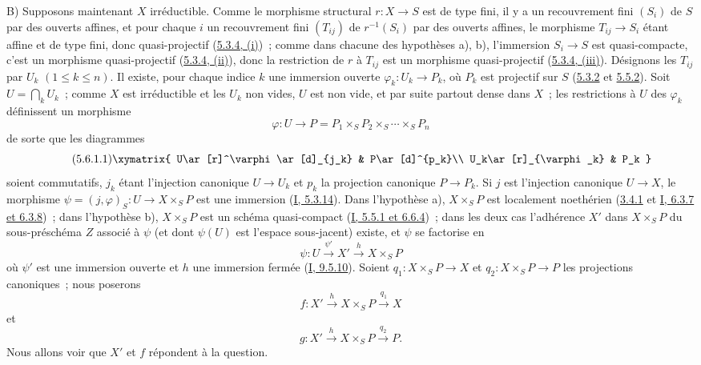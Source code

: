 B) Supposons maintenant $X$ irréductible. Comme le morphisme structural
$r:X\to S$ est de type fini, il y a un recouvrement fini $(S_i)$ de $S$ par
des ouverts affines, et pour chaque $i$ un recouvrement fini $(T_{ij})$ de
$r^{-1}(S_i)$ par des ouverts affines, le morphisme $T_{ij}\to S_i$ étant
affine et de type fini, donc quasi-projectif
(\hyperref[II.5.3.4-fr]{5.3.4, (i)})~; comme dans chacune des hypothèses a),
b), l'immersion $S_i\to S$ est quasi-compacte, c'est un morphisme
quasi-projectif (\hyperref[II.5.3.4-fr]{5.3.4, (ii)}), donc la restriction de
$r$ à $T_{ij}$ est un morphisme quasi-projectif
(\hyperref[II.5.3.4-fr]{5.3.4, (iii)}). Désignons les $T_{ij}$ par $U_k$
$(1\leq k\leq n)$. Il existe, pour chaque indice $k$ une immersion ouverte
$\varphi_k:U_k\to P_k$, où $P_k$ est projectif sur $S$
(\hyperref[II.5.3.2-fr]{5.3.2} et \hyperref[II.5.5.2-fr]{5.5.2}). Soit
$U=\bigcap_kU_k$~; comme $X$ est irréductible et les $U_k$ non vides, $U$ est
non vide, et par suite partout dense dans $X$~; les restrictions à $U$ des
$\varphi_k$ définissent un morphisme
\[
\varphi:U\to P=P_1\times_SP_2\times_S\cdots\times_SP_n
\]
de sorte que les diagrammes
\[
\tag{5.6.1.1}
\label{II.5.6.1.1-fr}
\xymatrix{
U\ar[r]^\varphi\ar[d]_{j_k} & P\ar[d]^{p_k}\\
U_k\ar[r]_{\varphi_k} & P_k
}
\]
soient commutatifs, $j_k$ étant l'injection canonique $U\to U_k$ et $p_k$ la
projection canonique $P\to P_k$. Si $j$ est l'injection canonique $U\to X$,
le morphisme $\psi=(j,\varphi)_S:U\to X\times_SP$ est une immersion
(\hyperref[I.5.3.14-fr]{I, 5.3.14}). Dans l'hypothèse a), $X\times_SP$ est
localement noethérien (\hyperref[II.3.4.1-fr]{3.4.1} et
\hyperref[I.6.3.7-fr]{I, 6.3.7 et 6.3.8})~; dans l'hypothèse b),
$X\times_SP$ est un schéma quasi-compact
(\hyperref[I.5.5.1-fr]{I, 5.5.1 et 6.6.4})~; dans les deux cas l'adhérence
$X'$ dans $X\times_SP$ du sous-préschéma $Z$ associé à $\psi$ (et dont
$\psi(U)$ est l'espace sous-jacent) existe, et $\psi$ se factorise en
\[
\tag{5.6.1.2}
\label{II.5.6.1.2-fr}
\psi:U\xrightarrow{\psi'}X'\xrightarrow{h}X\times_SP
\]
où $\psi'$ est une immersion ouverte et $h$ une immersion fermée
(\hyperref[I.9.5.10-fr]{I, 9.5.10}). Soient
$q_1:X\times_SP\to X$ et $q_2:X\times_SP\to P$ les projections canoniques~;
nous poserons
\[
\tag{5.6.1.3}
\label{II.5.6.1.3-fr}
f:X'\xrightarrow{h}X\times_SP\xrightarrow{q_1}X
\]
et
\[
\tag{5.6.1.4}
\label{II.5.6.1.4-fr}
g:X'\xrightarrow{h}X\times_SP\xrightarrow{q_2}P.
\]
Nous allons voir que $X'$ et $f$ répondent à la question.

